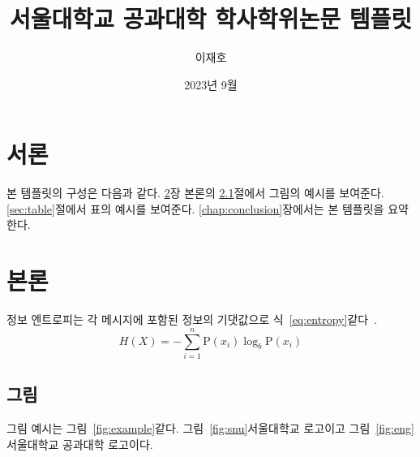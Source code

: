 \documentclass[ko]{snu-ece-bsc-thesis}
\title{서울대학교 공과대학 학사학위논문 템플릿}
\author{이재호}
\date{2023년 9월}
\begin{document}
\maketitle

\begin{abstract}
  \jiwon[1]
\end{abstract}

\tableofcontents
\listoftables
\listoffigures

\chapter{서론}\label{chap:introduction}
본 템플릿의 구성은 다음과 같다.
\ref{chap:body}장 본론의 \ref{sec:picture}절에서 그림의 예시를 보여준다.
\ref{sec:table}절에서 표의 예시를 보여준다.
\ref{chap:conclusion}장에서는 본 템플릿을 요약한다.

\jiwon[2-3]


\chapter{본론}\label{chap:body}
정보 엔트로피는 각 메시지에 포함된 정보의 기댓값으로 식~\eqref{eq:entropy}\와 같다~\cite{6773024}.
\begin{equation}\label{eq:entropy}
  H(X) = -\sum_{i=1}^n {\mathrm{P}(x_i) \log_b \mathrm{P}(x_i)}
\end{equation}

\jiwon[4-6]


\section{그림}\label{sec:picture}
그림 예시는 그림~\ref{fig:example}\와 같다. 그림~\ref{fig:snu}\은 서울대학교 로고이고 그림~\ref{fig:eng}\는 서울대학교 공과대학 로고이다.
\end{document}
